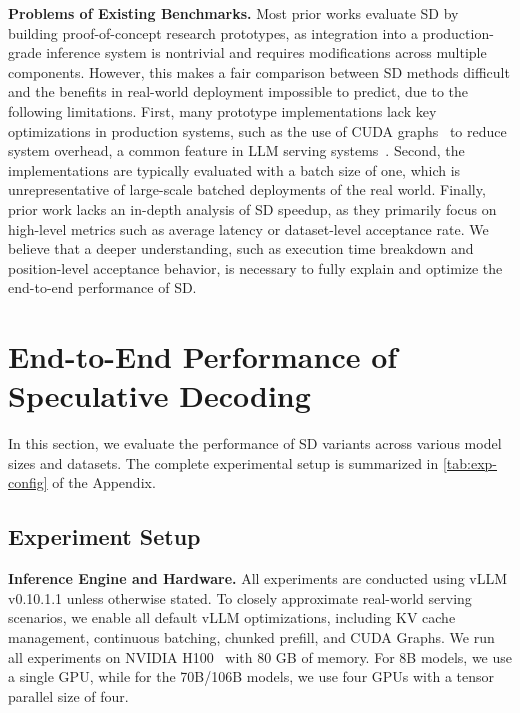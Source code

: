 \documentclass{article}
\newcommand{\jerry}[1]{\textcolor{cyan}{Jerry: #1}}
\begin{document}
\textbf{Problems of Existing Benchmarks.}
Most prior works evaluate SD by building proof-of-concept research prototypes, as integration into a production-grade inference system is nontrivial and requires modifications across multiple components.
However, this makes a fair comparison between SD methods difficult and the benefits in real-world deployment impossible to predict, due to the following limitations.
First, many prototype implementations lack key optimizations in production systems, such as the use of CUDA graphs~\cite{cudagraph} to reduce system overhead, a common feature in LLM serving systems~\cite{kwon2023efficient, zheng2024sglang}.
Second, the implementations are typically evaluated with a batch size of one, which is unrepresentative of large-scale batched deployments of the real world.
Finally, prior work lacks an in-depth analysis of SD speedup, as they primarily focus on high-level metrics such as average latency or dataset-level acceptance rate. \cite{li2024eagle,li2025eagle3,xia-etal-2024-unlocking}
We believe that a deeper understanding, such as execution time breakdown and position-level acceptance behavior, is necessary to fully explain and optimize the end-to-end performance of SD.


\section{End-to-End Performance of Speculative Decoding}
\label{sect:e2e-perf}
In this section, we evaluate the performance of SD variants across various model sizes and datasets.
The complete experimental setup is summarized in  \autoref{tab:exp-config} of the Appendix.

\subsection{Experiment Setup}
\textbf{Inference Engine and Hardware.}
All experiments are conducted using vLLM v0.10.1.1 unless otherwise stated.
To closely approximate real-world serving scenarios, we enable all default vLLM optimizations, 
including KV cache management, continuous batching, chunked prefill, and CUDA Graphs.
We run all experiments on NVIDIA H100~\cite{h100} with 80 GB of memory.
For 8B models, we use a single GPU, while for the 70B/106B models, we use four GPUs with a tensor parallel size of four. 
\end{document}
